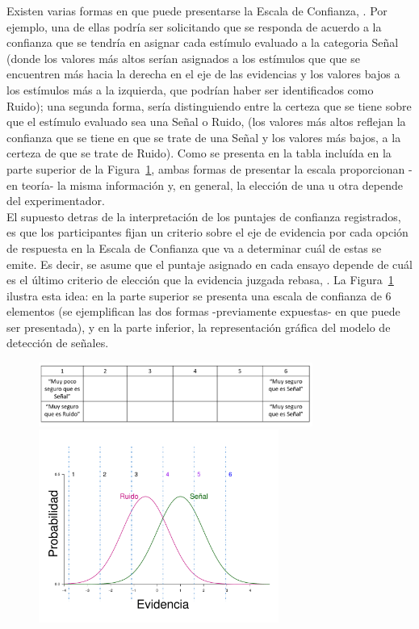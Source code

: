 \begin{itemize}
Existen varias formas en que puede presentarse la Escala de Confianza, \parencite{McNicol2}. Por ejemplo, una de ellas podría ser solicitando que se responda de acuerdo a la confianza que se tendría en asignar cada estímulo evaluado a la categoria Señal (donde los valores más altos serían asignados a los estímulos que que se encuentren más hacia la derecha en el eje de las evidencias y los valores bajos a los estímulos más a la izquierda, que podrían haber ser identificados como Ruido); una segunda forma, sería distinguiendo entre la certeza que se tiene sobre que el estímulo evaluado sea una Señal o Ruido, (los valores más altos reflejan la confianza que se tiene en que se trate de una Señal y los valores más bajos, a la certeza de que se trate de Ruido). Como se presenta en la tabla incluída en la parte superior de la Figura~\ref{fig:Conf_Rat}, ambas formas de presentar la escala proporcionan -en teoría- la misma información y, en general, la elección de una u otra depende del experimentador.\\

El supuesto detras de la interpretación de los puntajes de confianza registrados, es que los participantes fijan un criterio sobre el eje de evidencia por cada opción de respuesta en la Escala de Confianza que va a determinar cuál de estas se emite. Es decir, se asume que el puntaje asignado en cada ensayo depende de cuál es el último criterio de elección que la evidencia juzgada rebasa, \parencite{McNicol2}. La Figura~\ref{fig:Conf_Rat} ilustra esta idea: en la parte superior se presenta una escala de confianza de 6 elementos (se ejemplifican las dos formas -previamente expuestas- en que puede ser presentada), y en la parte inferior, la representación gráfica del modelo de detección de señales.\\

\begin{figure}[th]
\centering
\includegraphics[width=0.80\textwidth]{Figures/Puntajes_Criterios}\\
\includegraphics[width=0.70\textwidth]{Figures/ConfidenceRating}\\
\caption[Ejemplo ]{}
\label{fig:Conf_Rat}
\end{figure}



\end{itemize}

